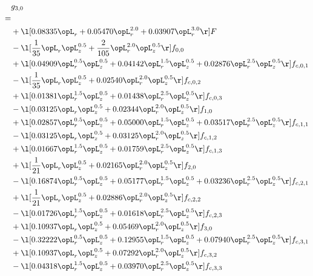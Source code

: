 \begin{alignat}{2} 
\label{eq:g_30_0} 
& g_{3,0} \nonumber \\ 
 = \\ 
& + \l[  0.08335 \opL_r +  0.05470 \opL_r^{2.0} +  0.03907 \opL_r^{3.0}  \r] F \nonumber \\ 
& - \l[ \frac{1}{35} \opL_r \opL_z^{0.5} + \frac{2}{105} \opL_r^{2.0} \opL_z^{0.5}  \r] f_{0,0} \nonumber \\ 
& + \l[  0.04909 \opL_r^{0.5} \opL_z^{0.5} +  0.04142 \opL_r^{1.5} \opL_z^{0.5} +  0.02876 \opL_r^{2.5} \opL_z^{0.5}  \r] f_{c,0,1} \nonumber \\ 
& - \l[ \frac{1}{35} \opL_r \opL_z^{0.5} +  0.02540 \opL_r^{2.0} \opL_z^{0.5}  \r] f_{c,0,2} \nonumber \\ 
& + \l[  0.01381 \opL_r^{1.5} \opL_z^{0.5} +  0.01438 \opL_r^{2.5} \opL_z^{0.5}  \r] f_{c,0,3} \nonumber \\ 
& - \l[  0.03125 \opL_r \opL_z^{0.5} +  0.02344 \opL_r^{2.0} \opL_z^{0.5}  \r] f_{1,0} \nonumber \\ 
& + \l[  0.02857 \opL_r^{0.5} \opL_z^{0.5} +  0.05000 \opL_r^{1.5} \opL_z^{0.5} +  0.03517 \opL_r^{2.5} \opL_z^{0.5}  \r] f_{c,1,1} \nonumber \\ 
& - \l[  0.03125 \opL_r \opL_z^{0.5} +  0.03125 \opL_r^{2.0} \opL_z^{0.5}  \r] f_{c,1,2} \nonumber \\ 
& + \l[  0.01667 \opL_r^{1.5} \opL_z^{0.5} +  0.01759 \opL_r^{2.5} \opL_z^{0.5}  \r] f_{c,1,3} \nonumber \\ 
& + \l[ \frac{1}{21} \opL_r \opL_z^{0.5} +  0.02165 \opL_r^{2.0} \opL_z^{0.5}  \r] f_{2,0} \nonumber \\ 
& - \l[  0.16874 \opL_r^{0.5} \opL_z^{0.5} +  0.05177 \opL_r^{1.5} \opL_z^{0.5} +  0.03236 \opL_r^{2.5} \opL_z^{0.5}  \r] f_{c,2,1} \nonumber \\ 
& + \l[ \frac{1}{21} \opL_r \opL_z^{0.5} +  0.02886 \opL_r^{2.0} \opL_z^{0.5}  \r] f_{c,2,2} \nonumber \\ 
& - \l[  0.01726 \opL_r^{1.5} \opL_z^{0.5} +  0.01618 \opL_r^{2.5} \opL_z^{0.5}  \r] f_{c,2,3} \nonumber \\ 
& + \l[  0.10937 \opL_r \opL_z^{0.5} +  0.05469 \opL_r^{2.0} \opL_z^{0.5}  \r] f_{3,0} \nonumber \\ 
& - \l[  0.32222 \opL_r^{0.5} \opL_z^{0.5} +  0.12955 \opL_r^{1.5} \opL_z^{0.5} +  0.07940 \opL_r^{2.5} \opL_z^{0.5}  \r] f_{c,3,1} \nonumber \\ 
& + \l[  0.10937 \opL_r \opL_z^{0.5} +  0.07292 \opL_r^{2.0} \opL_z^{0.5}  \r] f_{c,3,2} \nonumber \\ 
& - \l[  0.04318 \opL_r^{1.5} \opL_z^{0.5} +  0.03970 \opL_r^{2.5} \opL_z^{0.5}  \r] f_{c,3,3} \nonumber \\ 
\end{alignat} 


